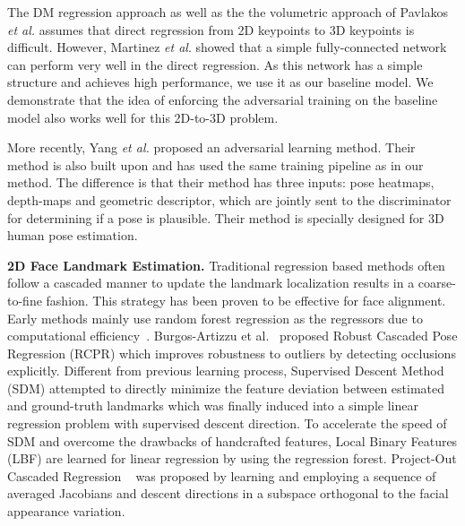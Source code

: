 \documentclass[10pt,journal,compsoc]{IEEEtran}
\begin{document}
The DM regression approach as well as the the volumetric approach of Pavlakos \emph{et al.}
assumes that  direct regression from 2D keypoints to 3D keypoints is difficult.
However, Martinez \emph{et al}. \cite{martinez2017simple} showed that a simple fully-connected network can perform very well in the direct regression.
%
As this network has a simple structure and achieves high performance, we use it as our baseline model.
We demonstrate that the idea of enforcing the adversarial training  on the baseline model also works well for this 2D-to-3D problem.

More recently, Yang \emph{et al.} \cite{yang20183d} proposed an adversarial learning method. Their  method is  also built upon \cite{martinez2017simple} and has used the same training pipeline as in our method. The difference is that their method has three inputs: pose heatmaps, depth-maps and geometric descriptor,
which are jointly sent to the discriminator for determining if a pose is plausible. Their method is specially designed for 3D human pose estimation.




{\bf 2D Face Landmark Estimation.}
Traditional regression based methods often follow a cascaded manner to update the landmark localization results in a coarse-to-fine fashion.
This strategy has been proven to be  effective for face alignment.
Early methods mainly use random forest regression as the regressors due to computational efficiency~\cite{dollar2010cascaded,cao2014face,dantone2012real,valstar2010facial}.
Burgos-Artizzu et al.~\cite{burgos2013robust} proposed  Robust Cascaded Pose Regression (RCPR) which improves robustness to outliers by detecting occlusions explicitly.
Different from previous learning process, Supervised Descent Method (SDM) \cite{xiong2013supervised} attempted to directly minimize the feature deviation between estimated and ground-truth landmarks which was finally induced into a simple linear regression problem with supervised descent direction.
To accelerate the speed of SDM and overcome the drawbacks of handcrafted features, Local Binary Features (LBF) \cite{ren2014face} are learned for linear regression by using the regression forest.
Project-Out Cascaded Regression ~\cite{tzimiropoulos2015project} was proposed by learning and employing a sequence of averaged Jacobians and descent directions in a subspace orthogonal to the facial appearance variation.
\end{document}
